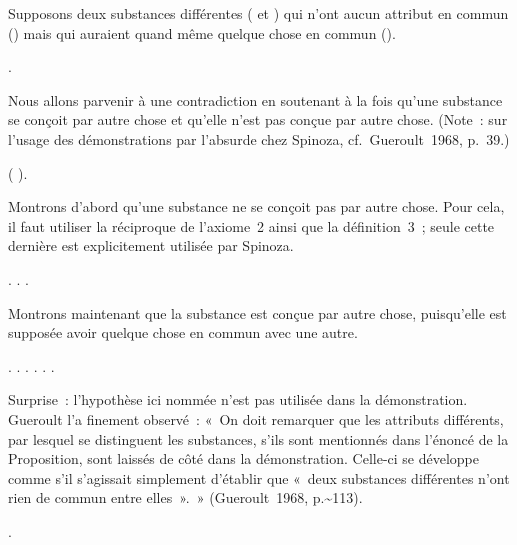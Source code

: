 \documentclass[12pt]{report}
\begin{document}
 Supposons deux substances différentes ( et ) qui n'ont
    aucun attribut en commun () mais qui auraient quand même
    quelque chose en commun (). \begin{coqdoccode}
\coqdocemptyline
\coqdocindent{2.00em}
       .\coqdoceol
\coqdocemptyline
\end{coqdoccode}
Nous allons parvenir à une contradiction en soutenant à la fois
    qu'une substance se conçoit par autre chose et qu'elle n'est pas
    conçue par autre chose. (Note : sur l'usage des démonstrations par
    l'absurde chez Spinoza, cf. Gueroult 1968, p. 39.) \begin{coqdoccode}
\coqdocemptyline
\coqdocindent{2.00em}
 ( ).\coqdoceol
\coqdocemptyline
\end{coqdoccode}
Montrons d'abord qu'une substance ne se conçoit pas par autre
    chose. Pour cela, il faut utiliser la réciproque de l'axiome 2 ainsi
    que la définition 3 ; seule cette dernière est explicitement
    utilisée par Spinoza. \begin{coqdoccode}
\coqdocemptyline
\coqdocindent{2.00em}
 .\coqdoceol
\coqdocindent{2.00em}
 .  .\coqdoceol
\coqdocemptyline
\end{coqdoccode}
Montrons maintenant que la substance est conçue par autre chose,
    puisqu'elle est supposée avoir quelque chose en commun avec une
    autre. \begin{coqdoccode}
\coqdocemptyline
\coqdocindent{2.00em}
 . \coqdoctac{\ensuremath{\exists}} . .  .\coqdoceol
\coqdocindent{2.00em}
 .  .\coqdoceol
\coqdocemptyline
\end{coqdoccode}
Surprise : l'hypothèse ici nommée  n'est pas utilisée dans
  la démonstration. Gueroult l'a finement observé : « On doit remarquer
  que les attributs différents, par lesquel se distinguent les
  substances, s'ils sont mentionnés dans l'énoncé de la Proposition,
  sont laissés de côté dans la démonstration. Celle-ci se développe
  comme s'il s'agissait simplement d'établir que « deux substances
  différentes n'ont rien de commun entre elles ». » (Gueroult 1968,
  p.\~{}113). \begin{coqdoccode}
\coqdocemptyline
\coqdocnoindent
{}.\coqdoceol
\coqdocemptyline
\end{coqdoccode}
\end{document}

